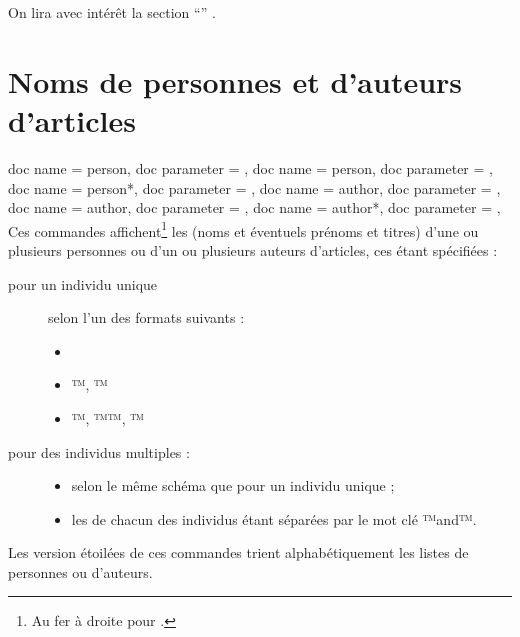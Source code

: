 \documentclass{letgut}
\begin{document}
\begin{ltx-code-result}[title addon=références croisées aux rubriques,listing options app={deletekeywords={[3]{nameref,section}}}]
On lira avec intérêt la section \enquote{}
.
\end{ltx-code-result}

\section[Personnes et auteurs]{Noms de personnes et d'auteurs d'articles}
\label{sec:sign-des-articl}


\begin{docCommands}[
  doc name = person,
  doc name = author,
  ]
  {
    {
      doc name = person,
      doc parameter = 
    },
    {
      doc name = person,
      doc parameter = 
    },
    {
      doc name = person*,
      doc parameter = 
    },
    {
      doc name = author,
      doc parameter = 
    },
    {
      doc name = author,
      doc parameter = 
    },
    {
      doc name = author*,
      doc parameter = 
    },
  }
  Ces commandes affichent\footnote{Au fer à droite pour .} les
   (noms et éventuels prénoms et titres) d'une ou plusieurs
  personnes ou d'un ou plusieurs auteurs d'articles, ces 
  étant spécifiées :
  \begin{description}
  \item[pour un individu unique] selon l'un des formats suivants :
    \begin{itemize}
    \item {}
    \item {}™, ™
    \item {}™, ™™, ™
    \end{itemize}
  \item[pour des individus multiples :]\leavevmode
    \begin{itemize}
    \item selon le même schéma que pour un individu unique ;
    \item les  de chacun des individus étant séparées par le mot clé
      ™and™.
    \end{itemize}
  \end{description}
  Les version étoilées de ces commandes trient alphabétiquement les listes de
  personnes ou d'auteurs.
\end{docCommands}
\end{document}
